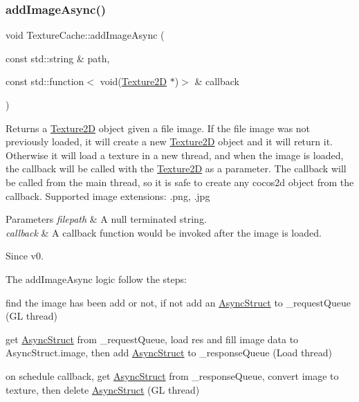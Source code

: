 \subsubsection{\texorpdfstring{add\+Image\+Async()}{addImageAsync()}\hspace{0.1cm}{\footnotesize\ttfamily [1/3]}}
{\footnotesize\ttfamily void Texture\+Cache\+::add\+Image\+Async (\begin{DoxyParamCaption}\item[{const std\+::string \&}]{path,  }\item[{const std\+::function$<$ void(\hyperlink{classTexture2D}{Texture2D} $\ast$)$>$ \&}]{callback }\end{DoxyParamCaption})\hspace{0.3cm}{\ttfamily [virtual]}}

Returns a \hyperlink{classTexture2D}{Texture2D} object given a file image. If the file image was not previously loaded, it will create a new \hyperlink{classTexture2D}{Texture2D} object and it will return it. Otherwise it will load a texture in a new thread, and when the image is loaded, the callback will be called with the \hyperlink{classTexture2D}{Texture2D} as a parameter. The callback will be called from the main thread, so it is safe to create any cocos2d object from the callback. Supported image extensions\+: .png, .jpg 
\begin{DoxyParams}{Parameters}
{\em filepath} & A null terminated string. \\
\hline
{\em callback} & A callback function would be invoked after the image is loaded. \\
\hline
\end{DoxyParams}
\begin{DoxySince}{Since}
v0.
\end{DoxySince}
The add\+Image\+Async logic follow the steps\+:
\begin{DoxyItemize}
\item find the image has been add or not, if not add an \hyperlink{structTextureCache_1_1AsyncStruct}{Async\+Struct} to \+\_\+request\+Queue (GL thread)
\item get \hyperlink{structTextureCache_1_1AsyncStruct}{Async\+Struct} from \+\_\+request\+Queue, load res and fill image data to Async\+Struct.\+image, then add \hyperlink{structTextureCache_1_1AsyncStruct}{Async\+Struct} to \+\_\+response\+Queue (Load thread)
\item on schedule callback, get \hyperlink{structTextureCache_1_1AsyncStruct}{Async\+Struct} from \+\_\+response\+Queue, convert image to texture, then delete \hyperlink{structTextureCache_1_1AsyncStruct}{Async\+Struct} (GL thread)
\end{DoxyItemize}

